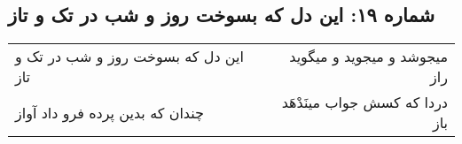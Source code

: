 \begin{center}
\section*{شماره ۱۹: این دل که بسوخت روز و شب در تک و تاز}
\label{sec:019}
\begin{longtable}{l p{0.5cm} r}
این دل که بسوخت روز و شب در تک و تاز
&&
میجوشد و میجوید و میگوید راز
\\
چندان که بدین پرده فرو داد آواز
&&
دردا که کسش جواب مینَدْهَد باز
\\
\end{longtable}
\end{center}
